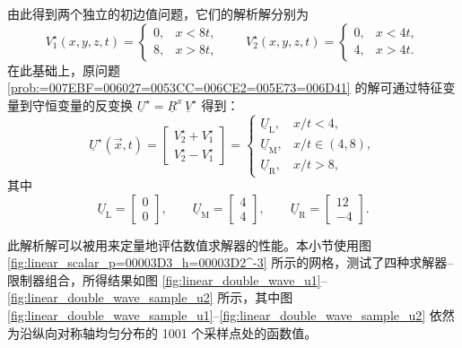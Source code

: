 由此得到两个独立的初边值问题，它们的解析解分别为
\begin{equation}
V_{1}^{\star}(x,y,z,t)=\begin{cases}
0, & x<8t,\\
8, & x>8t,
\end{cases}\qquad V_{2}^{\star}(x,y,z,t)=\begin{cases}
0, & x<4t,\\
4, & x>4t.
\end{cases}
\end{equation}
在此基础上，原问题 \ref{prob:=007EBF=006027=0053CC=006CE2=005E73=006D41} 的解可通过特征变量到守恒变量的反变换
$\underline{U}^{\star}=\underline{R}^{x}\,\underline{V}^{\star}$
得到：
\begin{equation}
\underline{U}^{\star}(\vec{x},t)=\begin{bmatrix}V_{2}^{\star}+V_{1}^{\star}\\
V_{2}^{\star}-V_{1}^{\star}
\end{bmatrix}=\begin{cases}
\underline{U}_{\mathrm{L}}, & x/t<4,\\
\underline{U}_{\mathrm{M}}, & x/t\in(4,8),\\
\underline{U}_{\mathrm{R}}, & x/t>8,
\end{cases}\label{eq:linear_double_wave_solution}
\end{equation}
其中
\begin{equation}
\underline{U}_{\mathrm{L}}=\begin{bmatrix}0\\
0
\end{bmatrix},\qquad\underline{U}_{\mathrm{M}}=\begin{bmatrix}4\\
4
\end{bmatrix},\qquad\underline{U}_{\mathrm{R}}=\begin{bmatrix}12\\
-4
\end{bmatrix}.
\end{equation}

此解析解可以被用来定量地评估数值求解器的性能。本小节使用图 \ref{fig:linear_scalar_p=00003D3_h=00003D2^-3}
所示的网格，测试了四种求解器–限制器组合，所得结果如图 \ref{fig:linear_double_wave_u1}–\ref{fig:linear_double_wave_sample_u2}
所示，其中图 \ref{fig:linear_double_wave_sample_u1}–\ref{fig:linear_double_wave_sample_u2}
依然为沿纵向对称轴均匀分布的 1001 个采样点处的函数值。

